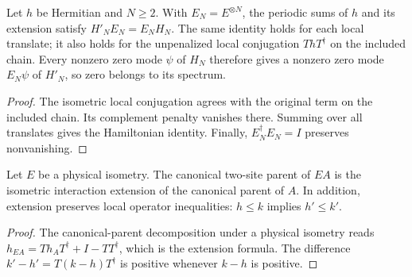 \begin{lemma}
    \label{thm:spt_isometric_interaction_zero_modes}
    \leanok
    Let $h$ be Hermitian and $N\ge2$. With $E_N=E^{\otimes N}$,
    the periodic sums of $h$ and its extension satisfy
    $H'_NE_N=E_NH_N$.
    The same identity holds for each local translate; it also holds
    for the unpenalized local conjugation $ThT^\dagger$ on the included chain.
    Every nonzero zero mode $\psi$ of $H_N$ therefore gives a nonzero
    zero mode $E_N\psi$ of $H'_N$, so zero belongs to its spectrum.
\end{lemma}

\begin{proof}\leanok
    The isometric local conjugation agrees with the original term on
    the included chain. Its complement penalty vanishes there.
    Summing over all translates gives the Hamiltonian identity.
    Finally, $E_N^\dagger E_N=I$ preserves nonvanishing.
\end{proof}

\begin{lemma}
    \label{thm:spt_isometric_parent_interaction}
    \leanok
    Let $E$ be a physical isometry. The canonical two-site parent
    of $EA$ is the isometric interaction extension of the
    canonical parent of $A$. In addition, extension preserves local
    operator inequalities: $h\le k$ implies $h'\le k'$.
\end{lemma}

\begin{proof}\leanok
    The canonical-parent decomposition under a physical isometry
    reads $h_{EA}=Th_AT^\dagger+I-TT^\dagger$, which is the extension
    formula. The difference $k'-h'=T(k-h)T^\dagger$ is positive
    whenever $k-h$ is positive.
\end{proof}

